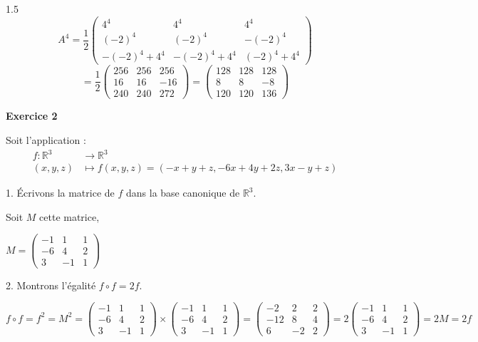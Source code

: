 \documentclass[12pt]{article}
\begin{document}
\begin{spacing}{1.5}
\[
A^4=\frac{1}{2}\begin{pmatrix}
4^4 & 4^4 & 4^4 \\ 
(-2)^4 & (-2)^4 & -(-2)^4 \\ 
-(-2)^4+4^4 & -(-2)^4+4^4 & (-2)^4+4^4
\end{pmatrix}
\]
\[
=\frac{1}{2}\begin{pmatrix}
256 & 256 & 256 \\ 
16 & 16 & -16 \\ 
240 & 240 & 272
\end{pmatrix} =\begin{pmatrix}
128 & 128 & 128 \\ 
8 & 8 & -8 \\ 
120 & 120 & 136
\end{pmatrix}
\]


\medskip
\textbf{Exercice 2}

Soit l'application : 
\begin{align*}
f:\mathbb{R}^3 &\longrightarrow \mathbb{R}^3\\
(x,y,z) &\longmapsto f(x,y,z)=(-x+y+z, -6x+4y+2z, 3x-y+z)
\end{align*} 

1. Écrivons la matrice de $f$ dans la base canonique de $\mathbb{R}^3$.

Soit $M$ cette matrice,

$M=\begin{pmatrix}
-1 & 1 & 1 \\ 
-6 & 4 & 2 \\ 
3 & -1 & 1
\end{pmatrix}$ 

2. Montrons l'égalité $f\circ f= 2f$.

$f\circ f=f^2=M^2=\begin{pmatrix}
-1 & 1 & 1 \\ 
-6 & 4 & 2 \\ 
3 & -1 & 1
\end{pmatrix}\times\begin{pmatrix}
-1 & 1 & 1 \\ 
-6 & 4 & 2 \\ 
3 & -1 & 1
\end{pmatrix}=\begin{pmatrix}
-2 & 2 & 2 \\ 
-12 & 8 & 4 \\ 
6 & -2 & 2
\end{pmatrix}=2\begin{pmatrix}
-1 & 1 & 1 \\ 
-6 & 4 & 2 \\ 
3 & -1 & 1
\end{pmatrix}=2M=2f$


\end{spacing}
\end{document}
